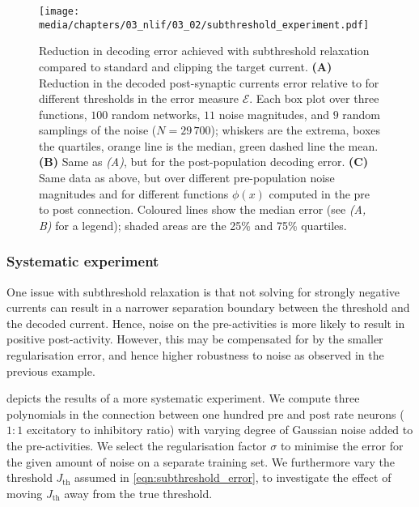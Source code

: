 \begin{figure}[t]
	\texttt{[image: media/chapters/03\_nlif/03\_02/subthreshold\_experiment.pdf]}%
	{\label{fig:subthreshold_experiment_a}}%
	{\label{fig:subthreshold_experiment_b}}%
	{\label{fig:subthreshold_experiment_c}}%
	\caption[Reduction in decoding error achieved with subthreshold relaxation]{Reduction in decoding error achieved with subthreshold relaxation compared to standard \NNLS and clipping the target current.
	\textbf{(A)} Reduction in the decoded post-synaptic currents error relative to \NNLS for different thresholds in the error measure $\mathcal{E}$.
	Each box plot over three functions, $100$ random networks, $11$ noise magnitudes, and $9$ random samplings of the noise ($N = 29\,700$); whiskers are the extrema, boxes the quartiles, orange line is the median, green dashed line the mean.
	\textbf{(B)}
	Same as \emph{(A)}, but for the post-population decoding error.
	\textbf{(C)} Same data as above, but over different pre-population noise magnitudes and for different functions $\phi(x)$ computed in the pre to post connection.
	Coloured lines show the median error (see \emph{(A, B)} for a legend); shaded areas are the 25\% and 75\% quartiles.
	}
	\label{fig:subthreshold_experiment}
\end{figure}

\subsubsection{Systematic experiment}
One issue with subthreshold relaxation is that not solving for strongly negative currents can result in a narrower separation boundary between the threshold and the decoded current.
Hence, noise on the pre-activities is more likely to result in positive post-activity.
However, this may be compensated for by the smaller regularisation error, and hence higher robustness to noise as observed in the previous example.

 depicts the results of a more systematic experiment.
We compute three polynomials in the connection between one hundred pre and post \LIF rate neurons ($1\!\!:\!\!1$ excitatory to inhibitory ratio) with varying degree of Gaussian noise added to the pre-activities.
We select the regularisation factor $\sigma$ to minimise the error for the given amount of noise on a separate training set.
We furthermore vary the threshold $J_\mathrm{th}$ assumed in \cref{eqn:subthreshold_error}, to investigate the effect of moving $J_\mathrm{th}$ away from the true threshold.

